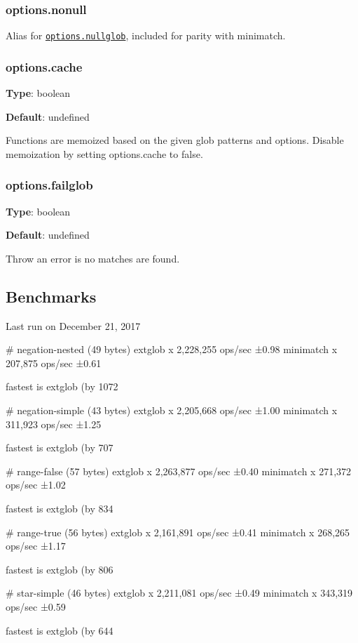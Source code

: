 \subsubsection*{options.\+nonull}

Alias for \href{#optionsnullglob}{\tt options.\+nullglob}, included for parity with minimatch.

\subsubsection*{options.\+cache}

{\bfseries Type}\+: {\ttfamily boolean}

{\bfseries Default}\+: {\ttfamily undefined}

Functions are memoized based on the given glob patterns and options. Disable memoization by setting {\ttfamily options.\+cache} to false.

\subsubsection*{options.\+failglob}

{\bfseries Type}\+: {\ttfamily boolean}

{\bfseries Default}\+: {\ttfamily undefined}

Throw an error is no matches are found.

\subsection*{Benchmarks}

Last run on December 21, 2017


\begin{DoxyCode}
# negation-nested (49 bytes)
  extglob x 2,228,255 ops/sec ±0.98%
  minimatch x 207,875 ops/sec ±0.61%

  fastest is extglob (by 1072%

# negation-simple (43 bytes)
  extglob x 2,205,668 ops/sec ±1.00%
  minimatch x 311,923 ops/sec ±1.25%

  fastest is extglob (by 707%

# range-false (57 bytes)
  extglob x 2,263,877 ops/sec ±0.40%
  minimatch x 271,372 ops/sec ±1.02%

  fastest is extglob (by 834%

# range-true (56 bytes)
  extglob x 2,161,891 ops/sec ±0.41%
  minimatch x 268,265 ops/sec ±1.17%

  fastest is extglob (by 806%

# star-simple (46 bytes)
  extglob x 2,211,081 ops/sec ±0.49%
  minimatch x 343,319 ops/sec ±0.59%

  fastest is extglob (by 644%
\end{DoxyCode}



